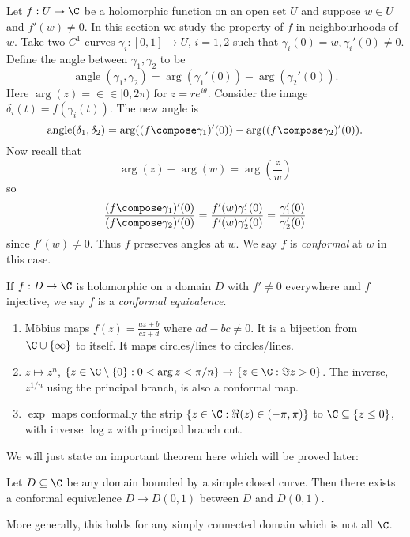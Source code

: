 \documentclass[a4paper]{article}
\begin{document}
Let \(f: U \to \C\) be a holomorphic function on an open set \(U\) and suppose \(w \in U\) and \(f'(w) \neq 0\). In this section we study the property of \(f\) in neighbourhoods of \(w\). Take two \(C^1\)-curves \(\gamma_i: [0, 1] \to U\), \(i = 1, 2\) such that \(\gamma_i(0) = w, \gamma_i'(0) \neq 0\). Define the angle between \(\gamma_1, \gamma_2\) to be
\[
  \operatorname{angle}(\gamma_1, \gamma_2) = \arg(\gamma_1'(0)) - \arg(\gamma_2'(0)).
\]
Here \(\arg(z) = \in \in [0, 2\pi)\) for \(z = re^{i\theta}\). Consider the image \(\delta_i(t) = f(\gamma_i(t))\). The new angle is
\[
  \operatorname{angle}(\delta_1, \delta_2) = \arg((f \compose \gamma_1)'(0)) - \arg((f \compose \gamma_2)'(0)).
\]
Now recall that
\[
  \arg(z) - \arg(w) = \arg(\frac{z}{w})
\]
so
\[
  \frac{(f \compose \gamma_1)'(0)}{(f \compose \gamma_2)'(0)}
  = \frac{f'(w)\gamma_1'(0)}{f'(w)\gamma_2'(0)}
  = \frac{\gamma_1'(0)}{\gamma_2'(0)}
\]
since \(f'(w) \neq 0\). Thus \(f\) preserves angles at \(w\). We say \(f\) is \emph{conformal} at \(w\) in this case.

\begin{definition}
  If \(f: D \to \C\) is holomorphic on a domain \(D\) with \(f' \neq 0\) everywhere and \(f\) injective, we say \(f\) is a \emph{conformal equivalence}.
\end{definition}

\begin{eg}\leavevmode
  \begin{enumerate}
  \item Möbius maps \(f(z) = \frac{az + b}{cz + d}\) where \(ad - bc \neq 0\). It is a bijection from \(\C \cup \{\infty\}\) to itself. It maps circles/lines to circles/lines.
  \item \(z \mapsto z^n\), \(\{z \in \C\setminus\{0\}: 0 < \arg z < \pi/n\} \to \{z \in \C: \Im z > 0\}\). The inverse, \(z^{1/n}\) using the principal branch, is also a conformal map.
  \item \(\exp\) maps conformally the strip \(\{z \in \C: \Re(z) \in (-\pi, \pi)\}\) to \(\C\subseteq\{z \leq 0\}\), with inverse \(\log z\) with principal branch cut.
  \end{enumerate}
\end{eg}

We will just state an important theorem here which will be proved later:

\begin{theorem}
  Let \(D \subseteq \C\) be any domain bounded by a simple closed curve. Then there exists a conformal equivalence \(D \to D(0, 1)\) between \(D\) and \(D(0, 1)\).

  More generally, this holds for any simply connected domain which is not all \(\C\).
\end{theorem}
\end{document}
